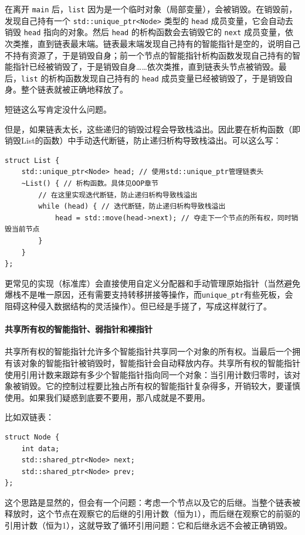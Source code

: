 在离开 \verb|main| 后，\verb|list| 因为是一个临时对象（局部变量），会被销毁。在销毁前，发现自己持有一个 \verb|std::unique_ptr<Node>| 类型的 \verb|head| 成员变量，它会自动去销毁 \verb|head| 指向的对象。然后 \verb|head| 的析构函数会去销毁它的 \verb|next| 成员变量，依次类推，直到链表最末端。链表最末端发现自己持有的智能指针是空的，说明自己不持有资源了，于是销毁自身；前一个节点的智能指针析构函数发现自己持有的智能指针已经被销毁了，于是销毁自身……依次类推，直到链表头节点被销毁。最后，\verb|list| 的析构函数发现自己持有的 \verb|head| 成员变量已经被销毁了，于是销毁自身。整个链表就被正确地释放了。

\begin{remark}{}
短链这么写肯定没什么问题。

但是，如果链表太长，这些递归的销毁过程会导致栈溢出。因此要在析构函数（即销毁List的函数）中手动迭代断链，防止递归析构导致栈溢出。可以这么写：
\begin{verbatim}
struct List {
    std::unique_ptr<Node> head; // 使用std::unique_ptr管理链表头
    ~List() { // 析构函数。具体见OOP章节
        // 在这里实现迭代断链，防止递归析构导致栈溢出
        while (head) { // 迭代断链，防止递归析构导致栈溢出
            head = std::move(head->next); // 夺走下一个节点的所有权，同时销毁当前节点
        }
    }
};
\end{verbatim}
更常见的实现（标准库）会直接使用自定义分配器和手动管理原始指针（当然避免爆栈不是唯一原因，还有需要支持转移拼接等操作，而\verb|unique_ptr|有些死板，会阻碍这种侵入数据结构的灵活操作）。但已经是手搓了，写成这样就行了。
\end{remark}

\paragraph{共享所有权的智能指针、弱指针和裸指针}

共享所有权的智能指针允许多个智能指针共享同一个对象的所有权。当最后一个拥有该对象的智能指针被销毁时，智能指针会自动释放内存。共享所有权的智能指针使用引用计数来跟踪有多少个智能指针指向同一个对象：当引用计数归零时，该对象被销毁。它的控制过程要比独占所有权的智能指针复杂得多，开销较大，要谨慎使用。如果我们疑惑到底要不要用，那八成就是不要用。

比如双链表：
\begin{verbatim}
struct Node {
    int data;
    std::shared_ptr<Node> next; 
    std::shared_ptr<Node> prev; 
};
\end{verbatim}
这个思路是显然的，但会有一个问题：考虑一个节点以及它的后继。当整个链表被释放时，这个节点在观察它的后继的引用计数（恒为1），而后继在观察它的前驱的引用计数（恒为1），这就导致了循环引用问题：它和后继永远不会被正确销毁。

